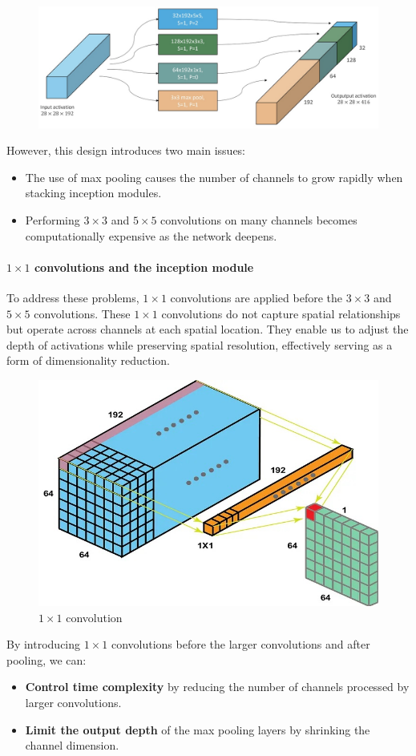 \begin{figure}[htbp]
  \centering
  \includegraphics[width=0.7\linewidth]{./img/inception_naive.jpg}
\end{figure}

However, this design introduces two main issues:
\begin{itemize}
  \item The use of max pooling causes the number of channels to grow rapidly when stacking inception modules.
  \item Performing $3 \times 3$ and $5 \times 5$ convolutions on many channels becomes computationally expensive as the network deepens.
\end{itemize}

\paragraph{$1 \times 1$ convolutions and the inception module}
To address these problems, $1 \times 1$ convolutions are applied before the $3\times 3$ and $5\times 5$ convolutions. These $1\times 1$ convolutions do not capture spatial relationships but operate across channels at each spatial location. They enable us to adjust the depth of activations while preserving spatial resolution, effectively serving as a form of dimensionality reduction.

\begin{figure}[htbp]
  \centering
  \includegraphics[width=0.6\linewidth]{./img/11conv.jpg}
  \caption{$1 \times 1$ convolution}
\end{figure}

By introducing $1\times 1$ convolutions before the larger convolutions and after pooling, we can:
\begin{itemize}
  \item \textbf{Control time complexity} by reducing the number of channels processed by larger convolutions.
  \item \textbf{Limit the output depth} of the max pooling layers by shrinking the channel dimension.
\end{itemize}

